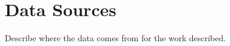 \section{Data Sources}
\label{sec:data-source}

Describe where the data comes from for the work described.